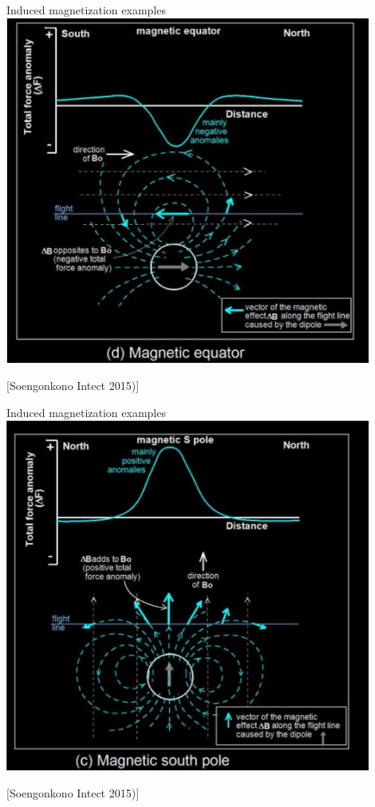 \begin{frame}
    \begin{PointSix}{Induced magnetization examples}
      \includegraphics[width=0.9\textwidth]{Figures/Magnetics/AnomalyMagneticEquator.png}

      [Soengonkono Intect 2015)]
    \end{PointSix}
\end{frame}

\begin{frame}
    \begin{PointSix}{Induced magnetization examples}
      \includegraphics[width=0.9\textwidth]{Figures/Magnetics/AnomalyMagneticSouthPole.png}

      [Soengonkono Intect 2015)]
    \end{PointSix}
\end{frame}

